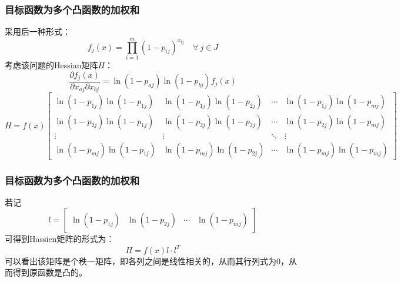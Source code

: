 \documentclass[CJK,10pt]{beamer}
\begin{document}
\begin{frame}
    \frametitle{目标函数为多个凸函数的加权和}
    采用后一种形式：
    \begin{equation*}
        f_j(x) =  \prod_{i=1}^m (1 -  p_{ij})^{x_{ij}}\quad \forall~  j \in J
    \end{equation*}
    考虑该问题的Hessian矩阵$H$：
    \begin{equation*}
        \frac{\partial f_j(x)}{\partial x_{aj} \partial x_{bj}} = \ln(1 - p_{aj}) \ln(1 - p_{bj}) f_j(x)
    \end{equation*}
    {
    \scriptsize
    \begin{equation*}
        H = f(x)\begin{bmatrix}
            \ln(1 - p_{1j}) \ln(1 - p_{1j}) & \ln(1 - p_{1j}) \ln(1 - p_{2j}) &\cdots & \ln(1 - p_{1j}) \ln(1 - p_{mj}) \\
            \ln(1 - p_{2j}) \ln(1 - p_{1j}) & \ln(1 - p_{2j}) \ln(1 - p_{2j}) &\cdots & \ln(1 - p_{2j}) \ln(1 - p_{mj}) \\
            \vdots & \vdots &\ddots &\vdots \\
            \ln(1 - p_{mj}) \ln(1 - p_{1j}) & \ln(1 - p_{mj}) \ln(1 - p_{2j}) &\cdots & \ln(1 - p_{mj}) \ln(1 - p_{mj})


        \end{bmatrix}
    \end{equation*}
    }
\end{frame}

\begin{frame}
    \frametitle{目标函数为多个凸函数的加权和}
    若记
    \begin{equation*}
        l = \begin{bmatrix}
            \ln(1 - p_{1j}) & \ln(1 - p_{2j}) & \cdots & \ln(1 - p_{mj})
        \end{bmatrix}
    \end{equation*}
    可得到Hassien矩阵的形式为：
    \begin{equation*}
        H = f(x)l\cdot l^T
    \end{equation*}
    可以看出该矩阵是个秩一矩阵，即各列之间是线性相关的，从而其行列式为0，从而得到原函数是凸的。
\end{frame}
\end{document}
